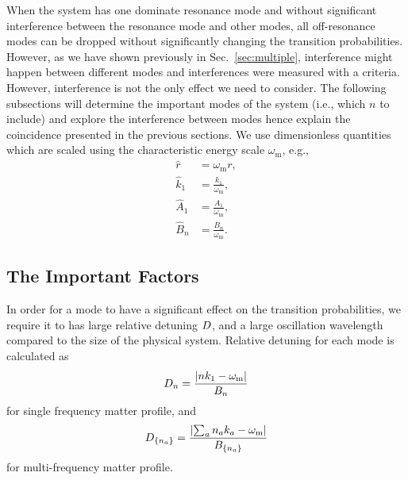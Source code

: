 When the system has one dominate resonance mode and without significant interference between the resonance mode and other modes, all off-resonance modes can be dropped without significantly changing the transition probabilities. However, as we have shown previously in Sec.~\ref{sec:multiple}, interference might happen between different modes and interferences were measured with a criteria. However, interference is not the only effect we need to consider. The following subsections will determine the important modes of the system (i.e., which $n$ to include) and explore the interference between modes hence explain the coincidence presented in the previous sections. We use dimensionless quantities which are scaled using the characteristic energy scale $\omega_{\mathrm{m}}$, e.g.,
\begin{align*}
    \hat r &= \omega_{\mathrm{m}}r, \\
    \hat k_1 & = \frac{k_1}{\omega_{\mathrm{m}}}, \\
    \hat A_1 & = \frac{A_1}{\omega_{\mathrm{m}}}, \\
    \hat B_n &= \frac{B_n}{\omega_{\mathrm{m}}}.
\end{align*}







\subsection{The Important Factors}


In order for a mode to have a significant effect on the transition probabilities, we require it to has large relative detuning $D$, and a large oscillation wavelength compared to the size of the physical system. Relative detuning for each mode is calculated as
\begin{equation}
D_n = \frac{\lvert n k_1 - \omega_{\mathrm{m}} \rvert}{B_n}
\end{equation}
for single frequency matter profile, and
\begin{equation}
D_{\{n_a\}} = \frac{\lvert \sum_a n_a k_a -\omega_{\mathrm m} \rvert }{B_{\{n_a\}}}
\end{equation}
for multi-frequency matter profile.


